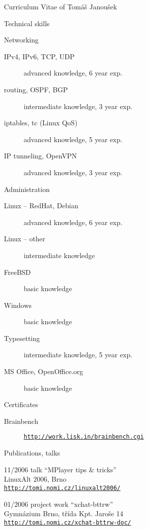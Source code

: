 \documentclass[12pt,a4paper,english,pdftex]{article}
\begin{document}
\begin{cv}{Curriculum Vitae of Tomáš Janoušek}
\begin{cvlist}{Technical skills}
        \item[Networking]
            \begin{description}
                \item[IPv4, IPv6, TCP, UDP] advanced knowledge, 6 year exp.
                \item[routing, OSPF, BGP] intermediate knowledge, 3 year exp.
                \item[iptables, tc (Linux QoS)] advanced knowledge, 5 year
                exp.
                \item[IP tunneling, OpenVPN] advanced knowledge, 3 year exp.
            \end{description}

        \item[Administration]
            \begin{description}
                \item[Linux -- RedHat, Debian] advanced knowledge, 6 year exp.
                \item[Linux -- other] intermediate knowledge
                \item[FreeBSD] basic knowledge %
                \item[Windows] basic knowledge
            \end{description}

        \item[Typesetting]
            \begin{description}
                \item[\LaTeXe] intermediate knowledge, 5 year exp.
                \item[MS Office, OpenOffice.org] basic knowledge
            \end{description}

        \item[Certificates]
            \begin{description}
                \item[Brainbench]
                    \href{http://work.lisk.in/brainbench.cgi}{\texttt{http://work.lisk.in/brainbench.cgi}}
            \end{description}
    \end{cvlist}

    \begin{cvlist}{Publications, talks}
        \item[11/2006]
            talk ``MPlayer tips \& tricks'' \\
            LinuxAlt 2006, Brno \\
            \href{http://tomi.nomi.cz/linuxalt2006/}{\texttt{http://tomi.nomi.cz/linuxalt2006/}}
        \item[01/2006]
            project work ``xchat-bttrw'' \\
            Gymnázium Brno, třída Kpt. Jaroše 14 \\
            \href{http://tomi.nomi.cz/xchat-bttrw-doc/}{\texttt{http://tomi.nomi.cz/xchat-bttrw-doc/}}
    \end{cvlist}


\end{cv}
\end{document}
